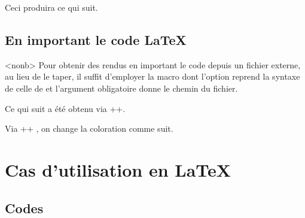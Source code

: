 \documentclass[10pt, a4paper]{article}
\begin{document}


\begin{bdocexa}
    \leavevmode


    Ceci produira ce qui suit.

    \medskip

    
\end{bdocexa}




\subsection{En important le code \LaTeX}

\begin{bdocexa}<nonb>
    Pour obtenir des rendus en important le code depuis un fichier externe, au lieu de le taper, il suffit d'employer la macro  dont l'option reprend la syntaxe de celle de  et l'argument obligatoire donne le chemin du fichier.

    \medskip

    Ce qui suit a été obtenu via \bdocinlatex++.

    \medskip


    \medskip

    Via \bdocinlatex++ , on change la coloration comme suit.

    \medskip

\end{bdocexa}


\section{Cas d'utilisation en \LaTeX}

\subsection{Codes }
\end{document}
